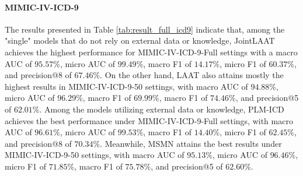 \documentclass[11pt]{article}
\begin{document}
\begin{table*}[!t]
\centering
{}
\caption{Results of ICD10 code prediction models on MIMIC-IV-ICD10-Full and MIMIC-IV-ICD10-50 test sets. 
}\label{tab:result_full_icd10}
\end{table*}


\paragraph{MIMIC-IV-ICD-9} The results presented in Table \ref{tab:result_full_icd9} indicate that, among the "single" models that do not rely on external data or knowledge, JointLAAT achieves the highest performance for MIMIC-IV-ICD-9-Full settings with a macro AUC of $95.57\%$, micro AUC of $99.49\%$, macro F1 of $14.17\%$, micro F1 of $60.37\%$, and precision@8 of $67.46\%$. On the other hand, LAAT also attains mostly the highest results in MIMIC-IV-ICD-9-50 settings, with macro AUC of $94.88\%$, micro AUC of $96.29\%$, macro F1 of $69.99\%$, macro F1 of $74.46\%$, and precision@5 of $62.01\%$. Among the models utilizing external data or knowledge, PLM-ICD achieves the best performance under MIMIC-IV-ICD-9-Full settings, with macro AUC of $96.61\%$, micro AUC of $99.53\%$, macro F1 of $14.40\%$, micro F1 of $62.45\%$, and precision@8 of $70.34\%$. Meanwhile, MSMN attains the best results under MIMIC-IV-ICD-9-50 settings, with macro AUC of $95.13\%$, micro AUC of $96.46\%$, micro F1 of $71.85\%$, macro F1 of $75.78\%$, and precision@5 of $62.60\%$.
\end{document}
